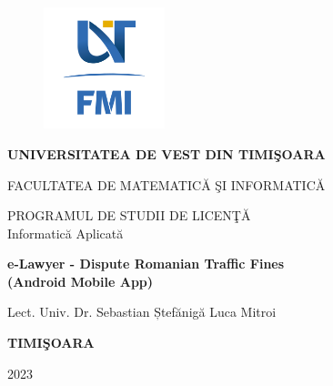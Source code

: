 \documentclass[12pt,a4paper]{report}
\theoremstyle{definition}
\theoremstyle{remark}
\begin{document}
\thispagestyle{empty}
\begin{center}
\begin{figure}[h!]
\vspace{-20pt}
\begin{center}
\includegraphics[width=100pt]{images/FMI-03}
\end{center}
\end{figure}
\graphicspath{ {D:\LaTeX_Template_Ro\Ro\images} }
\pagestyle{myfooter}



{\large{\bf UNIVERSITATEA DE VEST DIN TIMI\c SOARA

FACULTATEA DE MATEMATIC\u A \c SI INFORMATIC\u A

PROGRAMUL DE STUDII DE LICEN\c T\u A 
\newline
\\Informatică Aplicată}}

\vspace{120pt}

{\huge{\textbf{e-Lawyer - Dispute Romanian Traffic Fines} }}\\

{\large{\textbf{(Android Mobile App)} }}

\vspace{150pt}
\end{center}

{\large{}

\noindent Lect. Univ. Dr. Sebastian Ștefănigă \hfill Luca Mitroi}

\vfill
\begin{center}
{\bf TIMI\c SOARA

2023}
\end{center}

\newpage
\end{document}
